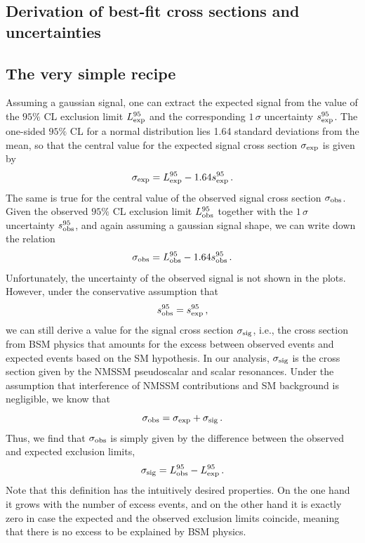 \documentclass[12pt]{article}
\begin{document}
\begin{appendices}

\section{Derivation of best-fit cross sections and uncertainties}
\label{sec:best-fit-xs}

\subsection{The very simple recipe}
Assuming a gaussian signal, one can extract the expected signal
from the value of the $95\%$ CL exclusion limit $L_{\rm exp}^{95}$
and the corresponding $1\,\sigma$ uncertainty $s_{\rm exp}^{95}$.
The one-sided $95\%$ CL for a normal distribution
lies 1.64 standard deviations from the mean, so that the
central value for the expected signal cross section $\sigma_{\rm exp}$
is given by
\begin{equation}
\sigma_{\rm exp} = L_{\rm exp}^{95} - 1.64 s_{\rm exp}^{95} \, .
\end{equation}
The same is true for the central value of the observed signal
cross section $\sigma_{\rm obs}$. Given the observed $95\%$ CL
exclusion limit $L_{\rm obs}^{95}$ together with the
$1\,\sigma$ uncertainty $s_{\rm obs}^{95}$, and again assuming a gaussian
signal shape, we can write down the relation
\begin{equation}
\sigma_{\rm obs} = L_{\rm obs}^{95} - 1.64 s_{\rm obs}^{95} \, .
\end{equation}
Unfortunately, the uncertainty of the observed signal is not
shown in the plots. However, under the conservative assumption that
\begin{equation}
s_{\rm obs}^{95} = s_{\rm exp}^{95} \, ,
\end{equation}
we can still derive a value for the signal cross section $\sigma_{\rm sig}$,
i.e., the cross section from BSM physics that amounts for the
excess between observed events and expected events based on the
SM hypothesis. In our analysis, $\sigma_{\rm sig}$ is the cross section
given by the NMSSM pseudoscalar and scalar resonances.
Under the assumption that interference of NMSSM contributions and SM
background is negligible, we know that
\begin{equation}
\sigma_{\rm obs} = \sigma_{\rm exp} + \sigma_{\rm sig} \, .
\end{equation}
Thus, we find that $\sigma_{\rm obs}$ is simply given by
the difference between the observed and expected exclusion limits,
\begin{equation}
\sigma_{\rm sig} = L_{\rm obs}^{95} - L_{\rm exp}^{95} \, .
\end{equation}
Note that this definition has the intuitively desired properties.
On the one hand it grows with the number of excess events, and
on the other hand it is exactly zero in case the expected and
the observed exclusion limits coincide, meaning that there is
no excess to be explained by BSM physics.


\end{appendices}
\end{document}
